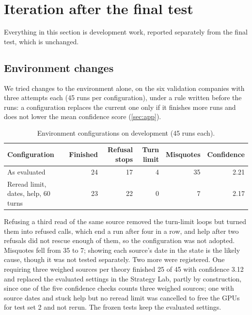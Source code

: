 \section{Iteration after the final test}\label{sec:iteration}
Everything in this section is development work, reported separately from the final test, which is unchanged.

\subsection{Environment changes}
We tried changes to the environment alone, on the six validation companies with three attempts each (45 runs per
configuration), under a rule written before the runs: a configuration replaces the current one only if it finishes more
runs and does not lower the mean confidence score (\cref{sec:app}).

\begin{table}[H]\centering\small
\caption{Environment configurations on development (45 runs each).}\label{tab:env}
\begin{tabular}{@{}lrrrrr@{}}
\toprule
Configuration & Finished & Refusal stops & Turn limit & Misquotes & Confidence\\
\midrule
As evaluated & 24 & 17 & 4 & 35 & 2.21\\
Reread limit, dates, help, 60 turns & 23 & 22 & 0 & 7 & 2.17\\
\bottomrule
\end{tabular}
\end{table}

Refusing a third read of the same source removed the turn-limit loops but turned them into refused calls, which end a run
after four in a row, and help after two refusals did not rescue enough of them, so the configuration was not adopted.
Misquotes fell from 35 to 7; showing each source's date in the state is the likely cause, though it was not tested
separately. Two more were registered. One requiring three weighed sources per theory finished 25 of 45 with confidence
3.12 and replaced the evaluated settings in the Strategy Lab, partly by construction, since one of the five confidence
checks counts three weighed sources; one with source dates and stuck help but no reread limit was cancelled to free the
GPUs for test set 2 and not rerun. The frozen tests keep the evaluated settings.

